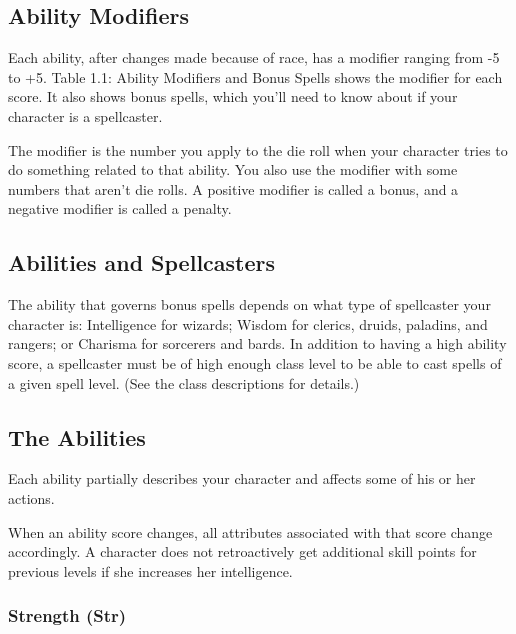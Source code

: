\subsection{Ability Modifiers}

Each ability, after changes made because of race, has a modifier ranging from -5 
to +5. Table 1.1: Ability Modifiers and Bonus Spells shows the modifier for each score. 
It also shows bonus spells, which you'll need to know about if your character is 
a spellcaster.

The modifier is the number you apply to the die roll when your character tries 
to do something related to that ability. You also use the modifier with some numbers that aren't die rolls. 
A positive modifier is called a bonus, and a negative modifier is called a penalty.

\subsection{Abilities and Spellcasters}

The ability that governs bonus spells depends on what type of spellcaster your 
character is: Intelligence for wizards; Wisdom for clerics, druids, paladins, and 
rangers; or Charisma for sorcerers and bards. In addition to having a high ability 
score, a spellcaster must be of high enough class level to be able to cast spells 
of a given spell level. (See the class descriptions for details.)

\subsection{The Abilities}

Each ability partially describes your character and affects some of his or her 
actions.

When an ability score changes, all attributes associated with that score change 
accordingly. A character does not retroactively get additional skill points for 
previous levels if she increases her intelligence.

\subsubsection{Strength (Str)}

